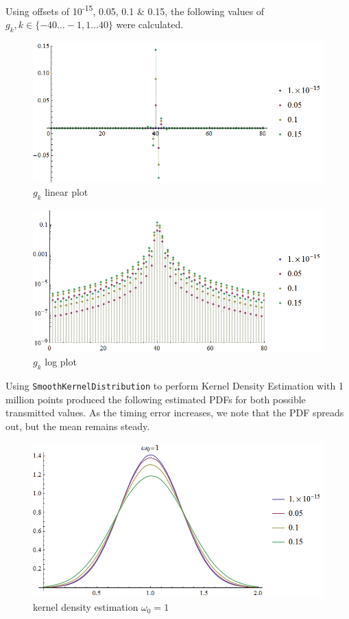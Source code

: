 Using offsets of 10\textsuperscript{-15}, 0.05, 0.1 \& 0.15, the
following values of $g_k, k \in \{ -40 \dots -1, 1 \dots 40 \}$ were
calculated.

\begin{figure}[htbp]
\centering
\includegraphics[width=\linewidth]{../../../plots/fyp1_w1_gklin.png}
\caption{$g_k$ linear plot}
\end{figure}

\begin{figure}[htbp]
\centering
\includegraphics[width=\linewidth]{../../../plots/fyp1_w1_gklog.png}
\caption{$g_k$ log plot}
\end{figure}

Using \texttt{SmoothKernelDistribution} to perform Kernel Density
Estimation with 1 million points produced the following estimated PDFs
for both possible transmitted values. As the timing error increases, we
note that the PDF spreads out, but the mean remains steady.

\begin{figure}[htbp]
\centering
\includegraphics[width=\linewidth]{../../../plots/fyp1_w1_kde.png}
\caption{kernel density estimation $\omega_0=1$}
\end{figure}

